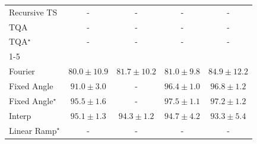 \begin{tabular}{l|cccc|}
Recursive TS & {\cellcolor[HTML]{000000}} \color[HTML]{F1F1F1} {\cellcolor{white}} \color{black} - & {\cellcolor[HTML]{000000}} \color[HTML]{F1F1F1} {\cellcolor{white}} \color{black} - & {\cellcolor[HTML]{000000}} \color[HTML]{F1F1F1} {\cellcolor{white}} \color{black} - & {\cellcolor[HTML]{000000}} \color[HTML]{F1F1F1} {\cellcolor{white}} \color{black} - \\
TQA & {\cellcolor[HTML]{000000}} \color[HTML]{F1F1F1} {\cellcolor{white}} \color{black} - & {\cellcolor[HTML]{000000}} \color[HTML]{F1F1F1} {\cellcolor{white}} \color{black} - & {\cellcolor[HTML]{000000}} \color[HTML]{F1F1F1} {\cellcolor{white}} \color{black} - & {\cellcolor[HTML]{000000}} \color[HTML]{F1F1F1} {\cellcolor{white}} \color{black} - \\
TQA$^\star$ & {\cellcolor[HTML]{000000}} \color[HTML]{F1F1F1} {\cellcolor{white}} \color{black} - & {\cellcolor[HTML]{000000}} \color[HTML]{F1F1F1} {\cellcolor{white}} \color{black} - & {\cellcolor[HTML]{000000}} \color[HTML]{F1F1F1} {\cellcolor{white}} \color{black} - & {\cellcolor[HTML]{000000}} \color[HTML]{F1F1F1} {\cellcolor{white}} \color{black} - \\
\cline{1-5}
\multicolumn{5}{c}{\rule{0pt}{8pt}SV} \\
\midrule
Fourier & {\cellcolor[HTML]{EDE8F3}} \color[HTML]{000000} $80.0\pm 10.9$ & {\cellcolor[HTML]{DAD9EA}} \color[HTML]{000000} $81.7\pm 10.2$ & {\cellcolor[HTML]{E2DFEE}} \color[HTML]{000000} $81.0\pm 9.8$ & {\cellcolor[HTML]{A9BFDC}} \color[HTML]{000000} $84.9\pm 12.2$ \\
Fixed Angle & {\cellcolor[HTML]{2383BA}} \color[HTML]{F1F1F1} $91.0\pm 3.0$ & {\cellcolor[HTML]{000000}} \color[HTML]{F1F1F1} {\cellcolor{white}} \color{black} - & {\cellcolor[HTML]{03476F}} \color[HTML]{F1F1F1} $96.4\pm 1.0$ & {\cellcolor[HTML]{034267}} \color[HTML]{F1F1F1} $96.8\pm 1.2$ \\
Fixed Angle$^\star$ & {\cellcolor[HTML]{045382}} \color[HTML]{F1F1F1} $95.5\pm 1.6$ & {\cellcolor[HTML]{000000}} \color[HTML]{F1F1F1} {\cellcolor{white}} \color{black} - & {\cellcolor[HTML]{023858}} \color[HTML]{F1F1F1} $97.5\pm 1.1$ & {\cellcolor[HTML]{023B5D}} \color[HTML]{F1F1F1} $97.2\pm 1.2$ \\
Interp & {\cellcolor[HTML]{04588A}} \color[HTML]{F1F1F1} $95.1\pm 1.3$ & {\cellcolor[HTML]{046097}} \color[HTML]{F1F1F1} $94.3\pm 1.2$ & {\cellcolor[HTML]{045D92}} \color[HTML]{F1F1F1} $94.7\pm 4.2$ & {\cellcolor[HTML]{0569A5}} \color[HTML]{F1F1F1} $93.3\pm 5.4$ \\
Linear Ramp$^\star$ & {\cellcolor[HTML]{000000}} \color[HTML]{F1F1F1} {\cellcolor{white}} \color{black} - & {\cellcolor[HTML]{000000}} \color[HTML]{F1F1F1} {\cellcolor{white}} \color{black} - & {\cellcolor[HTML]{000000}} \color[HTML]{F1F1F1} {\cellcolor{white}} \color{black} - & {\cellcolor[HTML]{000000}} \color[HTML]{F1F1F1} {\cellcolor{white}} \color{black} - \\

\end{tabular}
